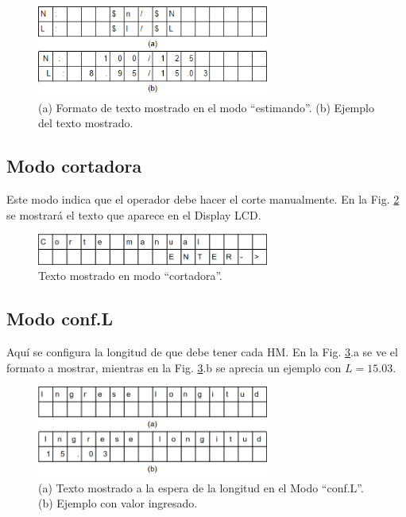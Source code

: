 \documentclass[main_conf.tex]{subfiles}
\begin{document}
\begin{figure}[!h]
  \centering
  \includegraphics[width=3.0in]{../img/modo/estimando.png}
  \caption{(a) Formato de texto mostrado en el modo “estimando”.
           (b) Ejemplo del texto mostrado.
  }
  \label{Modo_estimando}
\end{figure}

\subsection{Modo cortadora}
Este modo indica que el operador debe hacer el corte manualmente.
En la Fig. \ref{Modo_cortadora} se mostrará el texto que
aparece en el Display LCD.

\begin{figure}[!t]
  \centering
  \includegraphics[width=3.0in]{../img/modo/cortadora.png}
  \caption{Texto mostrado en modo “cortadora”.}
  \label{Modo_cortadora}
\end{figure}

\subsection{Modo conf.L}
Aquí se configura la longitud de que debe tener cada HM.
En la Fig. \ref{Modo_Conf_L}.a se ve el formato a mostrar,
mientras en la Fig. \ref{Modo_Conf_L}.b se aprecia un
ejemplo con $L = 15.03$.

\begin{figure}[!t]
  \centering
  \includegraphics[width=3.0in]{../img/modo/Conf_L.png}
  \caption{(a) Texto mostrado a la espera de la longitud en el Modo “conf.L”.
           (b) Ejemplo con valor ingresado.
  }
  \label{Modo_Conf_L}
\end{figure}
\end{document}
